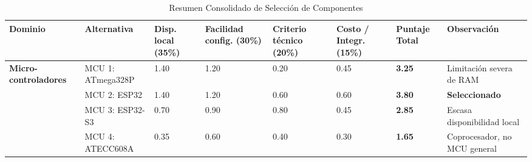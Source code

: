 \begin{landscape}
    \begin{table}[H]
        \centering
        \renewcommand{\arraystretch}{1.4}
        \fontsize{9}{10}\selectfont
        \caption{Resumen Consolidado de Selección de Componentes}
        \label{tabla:resumen_seleccion}
        \begin{tabular}{|p{2.8cm}|p{3.5cm}|p{1.5cm}|p{1.5cm}|p{1.5cm}|p{1.5cm}|p{1.5cm}|p{3.8cm}|}
            \hline
            \textbf{Dominio} & \textbf{Alternativa}                       & \textbf{Disp. local (35\%)} & \textbf{Facilidad config. (30\%)} & \textbf{Criterio técnico (20\%)} & \textbf{Costo / Integr. (15\%)} & \textbf{Puntaje Total}             & \textbf{Observación}                       \\ \hline

            \multirow{4}{*}{\parbox{2.8cm}{\textbf{Micro-controladores}}}
                             & MCU 1: ATmega328P                          & 1.40                        & 1.20                              & 0.20                             & 0.45                            & \textbf{3.25}                      & Limitación severa de RAM                   \\ \cline{2-8}
                             & \cellcolor{green!15} MCU 2: ESP32          & \cellcolor{green!15} 1.40   & \cellcolor{green!15} 1.20         & \cellcolor{green!15} 0.60        & \cellcolor{green!15} 0.60       & \cellcolor{green!15} \textbf{3.80} & \cellcolor{green!15} \textbf{Seleccionado} \\ \cline{2-8}
                             & MCU 3: ESP32-S3                            & 0.70                        & 0.90                              & 0.80                             & 0.45                            & \textbf{2.85}                      & Escasa disponibilidad local                \\ \cline{2-8}
                             & MCU 4: ATECC608A                           & 0.35                        & 0.60                              & 0.40                             & 0.30                            & \textbf{1.65}                      & Coprocesador, no MCU general               \\ \hline


\end{tabular}
\end{table}
\end{landscape}
